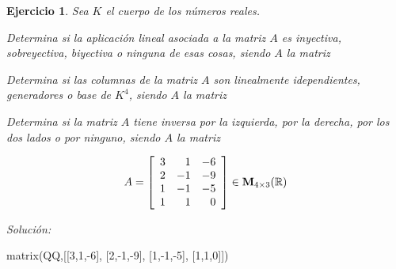 \documentclass[12pt]{amsart}
\newtheorem{ejer}{Ejercicio}
\begin{document}
\begin{ejer} Sea $K$ el cuerpo de los n\'umeros reales.
\newline
\noindent\begin{minipage}{\textwidth}
\begin{tcolorbox}[colback = green!20!white,title=Versión Aplicaciones]
Determina si la aplicaci\'on lineal asociada a la matriz $A$ es inyectiva, sobreyectiva, biyectiva o ninguna de esas cosas, siendo $A$ la matriz \end{tcolorbox}
\end{minipage} \newline
\noindent\begin{minipage}{\textwidth}
\begin{tcolorbox}[colback = blue!20!white,title=Versión Vectores]
Determina si las columnas de la matriz $A$ son linealmente idependientes, generadores o base de $K^{4}$, siendo $A$ la matriz \end{tcolorbox}
\end{minipage} \newline
\noindent\begin{minipage}{\textwidth} 
\begin{tcolorbox}[colback = red!20!white,title=Versión Inversas]
Determina si la matriz $A$ tiene inversa por la izquierda, por la derecha, por los dos lados o por ninguno, siendo $A$ la matriz 
\end{tcolorbox}
\end{minipage}
\[ A = \left[\begin{array}{rrr}
3 & 1 & -6 \\
2 & -1 & -9 \\
1 & -1 & -5 \\
1 & 1 & 0
\end{array}\right] \in {\bf M}_{4\times 3}({\mathbb R})\]
\end{ejer}

{\it Soluci\'on:}

\begin{sageblock}
matrix(QQ,[[3,1,-6],
[2,-1,-9],
[1,-1,-5],
[1,1,0]])
\end{sageblock}

\end{document}
